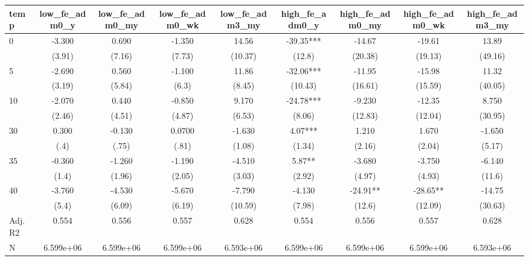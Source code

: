 \documentclass[]{article}
\begin{document}
\begin{tabular}{lcccccccc} \hline
temp & low\_fe\_adm0\_y & low\_fe\_adm0\_my & low\_fe\_adm0\_wk & low\_fe\_adm3\_my & high\_fe\_adm0\_y & high\_fe\_adm0\_my & high\_fe\_adm0\_wk & high\_fe\_adm3\_my \\ \hline
0 & -3.300 & 0.690 & -1.350 & 14.56 & -39.35*** & -14.67 & -19.61 & 13.89 \\
 & (3.91) & (7.16) & (7.73) & (10.37) & (12.8) & (20.38) & (19.13) & (49.16) \\
5 & -2.690 & 0.560 & -1.100 & 11.86 & -32.06*** & -11.95 & -15.98 & 11.32 \\
 & (3.19) & (5.84) & (6.3) & (8.45) & (10.43) & (16.61) & (15.59) & (40.05) \\
10 & -2.070 & 0.440 & -0.850 & 9.170 & -24.78*** & -9.230 & -12.35 & 8.750 \\
 & (2.46) & (4.51) & (4.87) & (6.53) & (8.06) & (12.83) & (12.04) & (30.95) \\
30 & 0.300 & -0.130 & 0.0700 & -1.630 & 4.07*** & 1.210 & 1.670 & -1.650 \\
 & (.4) & (.75) & (.81) & (1.08) & (1.34) & (2.16) & (2.04) & (5.17) \\
35 & -0.360 & -1.260 & -1.190 & -4.510 & 5.87** & -3.680 & -3.750 & -6.140 \\
 & (1.4) & (1.96) & (2.05) & (3.03) & (2.92) & (4.97) & (4.93) & (11.6) \\
40 & -3.760 & -4.530 & -5.670 & -7.790 & -4.130 & -24.91** & -28.65** & -14.75 \\
 & (5.4) & (6.09) & (6.19) & (10.59) & (7.98) & (12.6) & (12.09) & (30.63) \\
\hline Adj. R2 & 0.554 & 0.556 & 0.557 & 0.628 & 0.554 & 0.556 & 0.557 & 0.628 \\
 N & 6.599e+06 & 6.599e+06 & 6.599e+06 & 6.593e+06 & 6.599e+06 & 6.599e+06 & 6.599e+06 & 6.593e+06 \\ \hline
\end{tabular}
\end{document}
